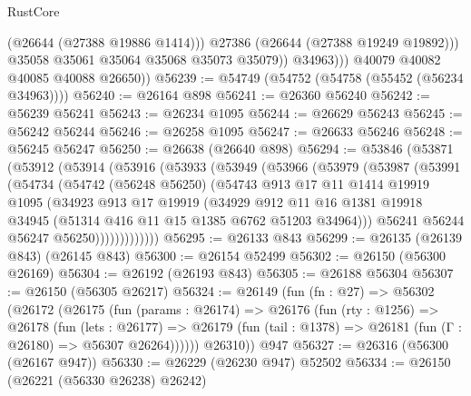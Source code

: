 \begin{lexlean}{RustCore}
\begin{coremodule}
                      (@26644 (@27388 @19886 @1414)))
                    @27386
                    (@26644 (@27388 @19249 @19892)))
                  @35058
                  @35061
                  @35064
                  @35068
                  @35073
                  @35079))
              @34963)))
        @40079
        @40082
        @40085
        @40088
        @26650))
@56239 := @54749 (@54752 (@54758 (@55452 (@56234 @34963))))
@56240 := @26164 @898
@56241 := @26360 @56240
@56242 := @56239 @56241
@56243 := @26234 @1095
@56244 := @26629 @56243
@56245 := @56242 @56244
@56246 := @26258 @1095
@56247 := @26633 @56246
@56248 := @56245 @56247
@56250 := @26638 (@26640 @898)
@56294 := @53846
    (@53871
      (@53912
        (@53914
          (@53916
            (@53933
              (@53949
                (@53966
                  (@53979
                    (@53987
                      (@53991
                        (@54734
                          (@54742
                            (@56248 @56250)
                            (@54743
                              @913
                              @17
                              @11
                              @1414
                              @19919
                              @1095
                              (@34923
                                @913
                                @17
                                @19919
                                (@34929
                                  @912
                                  @11
                                  @16
                                  @1381
                                  @19918
                                  @34945
                                  (@51314 @416 @11 @15 @1385 @6762 @51203 @34964)))
                              @56241
                              @56244
                              @56247
                              @56250)))))))))))))
@56295 := @26133 @843
@56299 := @26135 (@26139 @843) (@26145 @843)
@56300 := @26154 @52499
@56302 := @26150 (@56300 @26169)
@56304 := @26192 (@26193 @843)
@56305 := @26188 @56304
@56307 := @26150 (@56305 @26217)
@56324 := @26149
    (fun (fn : @27) =>
    @56302
      (@26172
        (@26175
          (fun (params : @26174) =>
          @26176
            (fun (rty : @1256) =>
            @26178
              (fun (lets : @26177) =>
              @26179 (fun (tail : @1378) => @26181 (fun (Γ : @26180) => @56307 @26264))))))
        @26310))
    @947
@56327 := @26316 (@56300 (@26167 @947))
@56330 := @26229 (@26230 @947) @52502
@56334 := @26150 (@26221 (@56330 @26238) @26242)

\end{coremodule}
\end{lexlean}
